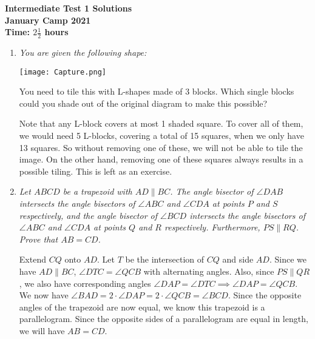 \documentclass{article}
\begin{document}
\thispagestyle{empty}

\begin{center}
  \textbf{\Large Intermediate Test 1 Solutions}
  \\ \vspace{1em}
  \textbf{\large January Camp 2021}
  \\ \vspace{1em}
  \textbf{\large Time: $2\frac{1}{2}$ hours}
\end{center}

\vspace{24pt}

\begin{enumerate}[1.]

\item {\itshape You are given the following shape: %
	\begin{center}
	\texttt{[image: Capture.png]}	
	\end{center}
You need to tile this with L-shapes made of 3 blocks. Which single blocks could you shade out of the original diagram to make this possible? }

Note that any L-block covers at most 1 shaded square. To cover all of them, we would need 5 L-blocks, covering a total of 15 squares, when we only have 13 squares. So without removing one of these, we will not be able to tile the image. On the other hand, removing one of these squares always results in a possible tiling. This is left as an exercise.

\item %
{\itshape Let $ABCD$ be a trapezoid with $AD \parallel BC$. The angle bisector of $\angle DAB$ intersects the angle bisectors of $\angle ABC$ and $\angle CDA$ at points $P$ and $S$ respectively, and the angle bisector of $\angle BCD$ intersects the angle bisectors of $\angle ABC$ and $\angle CDA$ at points $Q$ and $R$ respectively. Furthermore, $PS \parallel RQ$. Prove that $AB = CD$. }

Extend $CQ$ onto $AD$. Let $T$ be the intersection of $CQ$ and side $AD$.  Since we have $AD \parallel BC$, $\angle DTC = \angle QCB$ with alternating angles. 
Also, since $PS \parallel QR$, we also have corresponding angles $\angle DAP = \angle DTC \implies \angle DAP = \angle QCB$. We now have $\angle BAD = 2\cdot \angle DAP = 2\cdot \angle QCB = \angle BCD$. Since the opposite angles of the trapezoid are now equal, we know this trapezoid is a parallelogram. Since the opposite sides of a parallelogram are equal in length, we will have $AB = CD$.


\end{enumerate}
\end{document}
